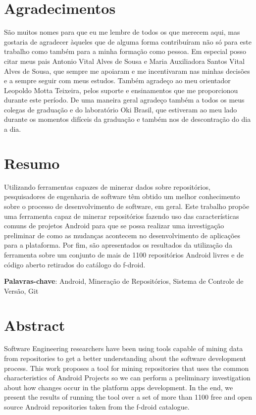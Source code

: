 \documentclass[a4paper,12pt]{article}
\begin{document}
\newpage
\section*{Agradecimentos}

São muitos nomes para que eu me lembre de todos os que merecem aqui, mas gostaria de agradecer àqueles que de alguma forma contribuíram não só para este trabalho como também para a minha formação como pessoa. Em especial posso citar meus pais Antonio Vital Alves de Sousa e Maria Auxiliadora Santos Vital Alves de Sousa, que sempre me apoiaram e me incentivaram nas minhas decisões e a sempre seguir com meus estudos. Também agradeço ao meu orientador Leopoldo Motta Teixeira, pelos suporte e ensinamentos que me proporcionou durante este período. De uma maneira geral agradeço também a todos os meus colegas de graduação e do laboratório Oki Brasil, que estiveram ao meu lado durante os momentos difíceis da graduação e também nos de  descontração do dia a dia.

\newpage
{} %
\section*{Resumo}
Utilizando ferramentas capazes de minerar dados sobre repositórios, pesquisadores de engenharia de software têm obtido um melhor conhecimento sobre o processo de desenvolvimento de software, em geral. Este trabalho propõe uma ferramenta capaz de minerar repositórios fazendo uso das características comuns de projetos Android para que se possa realizar uma investigação preliminar de como as mudanças acontecem no desenvolvimento de aplicações para a plataforma. Por fim, são apresentados os resultados da utilização da ferramenta sobre um conjunto de mais de 1100 repositórios Android livres e de código aberto retirados do catálogo do f-droid. 

\textbf{Palavras-chave}: Android, Mineração de Repositórios, Sistema de Controle de Versão, Git

\newpage
\section*{Abstract}

Software Engineering researchers have been using tools capable of mining data from repositories to get a better understanding about the software development process. This work proposes a tool for mining repositories that uses the common characteristics of Android Projects so we can perform a preliminary investigation about how changes occur in the platform apps development. In the end, we present the results of running the tool over a set of more than 1100 free and open source Android repositories taken from the f-droid catalogue. 
\end{document}
